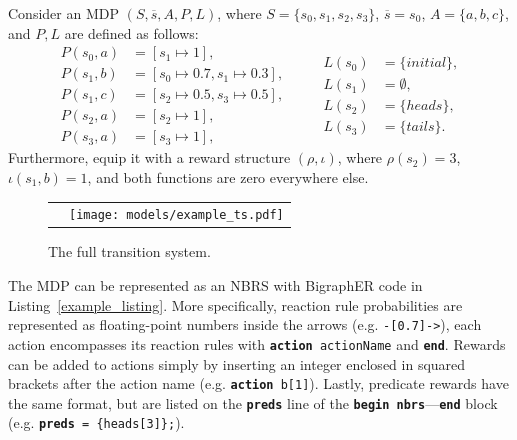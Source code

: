 \documentclass[runningheads]{llncs}
\begin{document}
\begin{example} \label{example}
  Consider an MDP $(S, \overline{s}, A, P, L)$, where $S = \{ s_0, s_1, s_2, s_3
  \}$, $\overline{s} = s_0$, $A = \{ a, b, c \}$, and $P, L$ are defined as
  follows:
  \begin{equation*}
    \begin{split}
      P(s_0, a) &= [s_1 \mapsto 1], \\
      P(s_1, b) &= [s_0 \mapsto 0.7, s_1 \mapsto 0.3], \\
      P(s_1, c) &= [s_2 \mapsto 0.5, s_3 \mapsto 0.5], \\
      P(s_2, a) &= [s_2 \mapsto 1], \\
      P(s_3, a) &= [s_3 \mapsto 1],
    \end{split}
    \qquad
    \begin{split}
      L(s_0) &= \{ initial \}, \\
      L(s_1) &= \emptyset, \\
      L(s_2) &= \{ heads \}, \\
      L(s_3) &= \{ tails \}.
    \end{split}
  \end{equation*}
  Furthermore, equip it with a reward structure $(\rho, \iota)$, where
  $\rho(s_2) = 3$, $\iota(s_1, b) = 1$, and both functions are zero everywhere
  else.
\end{example}

\begin{figure}
  \centering
  \begin{tabular}{p{}p{}}
    \begin{minipage}{0.5\textwidth}
      \centering
      
    \end{minipage}
    &
      \begin{minipage}{0.5\textwidth}
        \centering
        \vspace{12mm}
        \texttt{[image: models/example\_ts.pdf]}
        \caption{The full transition system.}
        \label{example_ts}
      \end{minipage}
  \end{tabular}
\end{figure}

The MDP can be represented as an NBRS with BigraphER code in
Listing~\ref{example_listing}. More specifically, reaction rule probabilities
are represented as floating-point numbers inside the arrows (e.g.
\texttt{-[0.7]->}), each action encompasses its reaction rules with
\texttt{\textbf{action} actionName} and \texttt{\textbf{end}}. Rewards can be
added to actions simply by inserting an integer enclosed in squared brackets
after the action name (e.g. \texttt{\textbf{action} b[1]}). Lastly, predicate
rewards have the same format, but are listed on the \texttt{\textbf{preds}} line
of the \texttt{\textbf{begin nbrs}}---\texttt{\textbf{end}} block (e.g.
\texttt{\textbf{preds} = \{heads[3]\};}).
\end{document}
